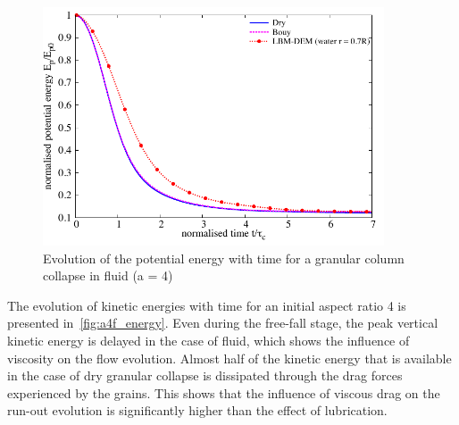 \begin{figure}
	\centering
    \includegraphics[width=0.9\textwidth]{PE_a4f}
    \caption{Evolution of the potential energy with time for a granular column 
    collapse in fluid (a = 4)}
    \label{fig:PE_a4f}
\end{figure}

The evolution of kinetic energies with time for an initial aspect ratio 4 is 
presented in~\cref{fig:a4f_energy}. Even during the free-fall stage, the peak 
vertical kinetic energy is delayed in the case of fluid, which shows the 
influence of viscosity on the flow evolution. Almost half of the kinetic energy 
that is available in the case of dry granular collapse is dissipated through 
the drag forces experienced by the grains. This shows that the influence of 
viscous drag on the run-out evolution is significantly higher than the effect 
of lubrication.

